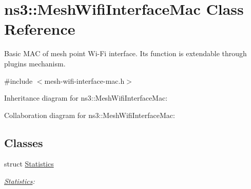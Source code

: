 \hypertarget{classns3_1_1MeshWifiInterfaceMac}{}\section{ns3\+:\+:Mesh\+Wifi\+Interface\+Mac Class Reference}
\label{classns3_1_1MeshWifiInterfaceMac}


Basic M\+AC of mesh point Wi-\/\+Fi interface. Its function is extendable through plugins mechanism.  




{\ttfamily \#include $<$mesh-\/wifi-\/interface-\/mac.\+h$>$}



Inheritance diagram for ns3\+:\+:Mesh\+Wifi\+Interface\+Mac\+:


Collaboration diagram for ns3\+:\+:Mesh\+Wifi\+Interface\+Mac\+:
\subsection*{Classes}
\begin{DoxyCompactItemize}
\item 
struct \hyperlink{structns3_1_1MeshWifiInterfaceMac_1_1Statistics}{Statistics}
\begin{DoxyCompactList}\small\item\em \hyperlink{structns3_1_1MeshWifiInterfaceMac_1_1Statistics}{Statistics}\+: \end{DoxyCompactList}\end{DoxyCompactItemize}
